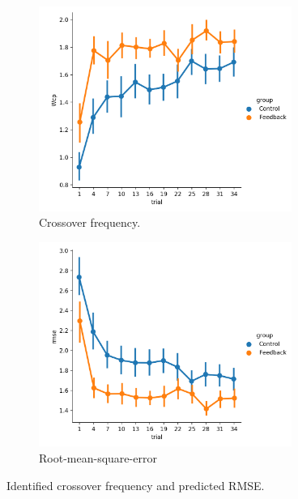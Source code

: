 \begin{figure}[h]
    \centering
    \begin{subfigure}[h]{0.49\textwidth}
        \centering
        \includegraphics[width=3.25in]{figures/wcp.png}
        \caption{Crossover frequency.}
        \label{fig:sm_crossover}
    \end{subfigure}
    \hfill
    \begin{subfigure}[h]{0.49\textwidth}
        \centering
        \includegraphics[width=3.25in]{figures/rmse.png}
        \caption{Root-mean-square-error}
        \label{fig:sm_rmse}
    \end{subfigure}
    \caption{Identified crossover frequency and predicted RMSE.}
\end{figure}

\clearpage

